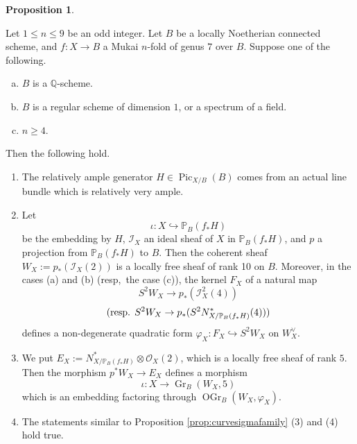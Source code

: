 \documentclass[autodetect-engine, a4paper]{amsart}
\theoremstyle{definition}
\newtheorem{prop}[thm]{Proposition}
\def\P{{\mathbb P}}
\def\Q{{\mathbb Q}}
\def\cO{\mathcal{O}}
\DeclareMathOperator\Pic{\mathrm{Pic}}
\DeclareMathOperator\Gr{\mathrm{Gr}}
\DeclareMathOperator\OGr{\mathrm{OGr}}
\newcommand{\cred}{\color{black}}
\newcommand{\cora}{\color{black}}
\begin{document}
\begin{prop}
\label{prop:Mukainfoldsigmafamily}
{\cora
Let $1 \leq n \leq 9$ be an odd integer.
Let $B$ be a locally Noetherian connected scheme, and $f \colon X \rightarrow B$ a Mukai $n$-fold of genus $7$ over $B$.
Suppose one of the following.
\begin{enumerate}[(a)]
\item 
$B$ is a $\Q$-scheme.
\item 
$B$ is a regular scheme of dimension $1$, or a spectrum of a field.
\item 
$n \geq 4$.
\end{enumerate}
Then the following hold.
}
\begin{enumerate}
\item 
The relatively ample generator $H \in \Pic_{X/B} (B)$ comes from an actual line bundle which is relatively very ample.
\item
Let 
\[
\iota \colon X \hookrightarrow \P_{B} (f_{\ast} H)
\]
be the embedding by $H$,
{\cred $\mathcal{I}_{X}$ an ideal sheaf of $X$ in $\P_{B}(f_{\ast} H)$,}
and $p$ a projection from $\P_{B} (f_{\ast} H)$ to $B$.
Then the coherent sheaf $W_{X}:= p_{\ast} (\mathcal{I}_{X} (2))$ is a locally free sheaf of rank 10 on $B$.
{\cora Moreover, in the cases (a) and (b) (resp,\ the case (c)), the kernel $F_{X}$ of a natural map
\[
S^{2} W_{X} \rightarrow p_{\ast} (\mathcal{I}_{X}^2 (4))
\]
\[
\textup{(resp. } 
S^{2} W_{X} \rightarrow p_{\ast} (S^2 N^*_{X/\P_{B}(f_{*}H)}(4))
\textup{)}
\]
defines a non-degenerate quadratic form $\varphi_{X} \colon F_{X} \hookrightarrow S^2 W_{X}$ on $W_{X}^{\vee}$.
}
\item 
We put $E_{X} := N_{X/\P_{B}(f_{\ast}H)}^{\ast} \otimes \cO_{X}(2)$, which is a locally free sheaf of rank $5$.
Then the morphism $p^{\ast} W_{X} \rightarrow E_{X}$ defines a morphism 
\[
\iota \colon X \rightarrow \Gr_B (W_{X}, 5) 
\]
which is an embedding factoring through $\OGr_B(W_{X}, \varphi_{X})$.
\item
The statements similar to Proposition \ref{prop:curvesigmafamily} (3) and (4) hold true.
\end{enumerate}
\end{prop}
\end{document}
